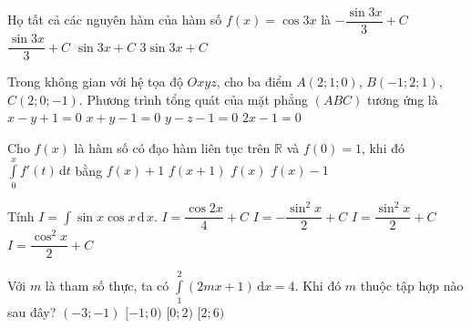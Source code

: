 \begin{ex}%
Họ tất cả các nguyên hàm của hàm số $f(x)=\cos 3x$ là
\choice
{$-\dfrac{\sin 3x}{3}+C$}
{\True $\dfrac{\sin 3x}{3}+C$}
{$\sin 3x+C$}
{$3 \sin 3x+C$}
\end{ex}

\begin{ex}%
Trong không gian với hệ tọa độ $Oxyz$, cho ba điểm $A(2;1;0)$, $B(-1;2;1)$, $C(2;0;-1)$. Phương trình tổng quát của mặt phẳng $(A B C)$ tương ứng là
\choice
{$x-y+1=0$}
{$x+y-1=0$}
{\True $y-z-1=0$}
{$2x-1=0$}
\end{ex}

\begin{ex}%
Cho $f(x)$ là hàm số có đạo hàm liên tục trên $\mathbb{R}$ và $f(0)=1$, khi đó $\displaystyle\int\limits_0^x f'(t)\mathrm{\,d}t$ bằng
\choice
{$f(x)+1$}
{$f(x+1)$}
{$f(x)$}
{\True $f(x)-1$}
\end{ex}

\begin{ex}%
Tính $ I = \displaystyle  \int \sin x \cos x\, \mathrm{d\,} x $.
\choice
{$ I =  \dfrac{\cos 2x}{4} + C $}
{$ I =  - \dfrac{\sin^2 x }{2} + C $}
{\True $ I =  \dfrac{\sin^2 x}{2} + C $}
{$ I =  \dfrac{\cos^2 x}{2} + C $}
\end{ex}

\begin{ex}%
Với $ m $ là tham số thực, ta có $ \displaystyle\int\limits_{1}^{2} (2mx+1)\mathrm{\,d}x =4$. Khi đó $ m $ thuộc tập hợp nào sau đây?
\choice
{$ (-3;-1) $}
{$ [-1;0) $}
{\True $ [0;2) $}
{$ [2;6) $}
\loigiai{
Ta có
\allowdisplaybreaks
\begin{eqnarray*}
&&\displaystyle\int\limits_{1}^{2} (2mx+1)\mathrm{\,d}x =4\\
&\Leftrightarrow&(mx^2+x)\bigg|^{2}_{1}=4\\
&\Leftrightarrow&4m+2-(m+1)=4\\
&\Leftrightarrow&m=1\in[0;2).
\end{eqnarray*}
}
\end{ex}

